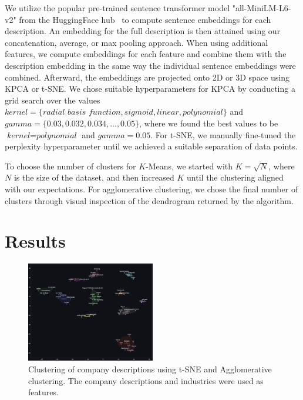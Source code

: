 \documentclass[conference]{IEEEtran}
\begin{document}
We utilize the popular pre-trained sentence transformer model "all-MiniLM-L6-v2" from the HuggingFace hub~\cite{sentence-transformer-model} to compute sentence embeddings for each description. An embedding for the full description is then attained using our concatenation, average, or max pooling approach. When using additional features, we compute embeddings for each feature and combine them with the description embedding in the same way the individual sentence embeddings were combined.
Afterward, the embeddings are projected onto 2D or 3D space using KPCA or t-SNE. We chose suitable hyperparameters for KPCA by conducting a grid search over the values $\textit{kernel} = \{\textit{radial basis function}, \textit{sigmoid}, \textit{linear}, \textit{polynomial} \}$ and $\textit{gamma} = \{0.03, 0.032, 0.034, \dots, 0.05\}$, where we found the best values to be $\textit{kernel} = \textit{polynomial}$ and $\textit{gamma} = 0.05$. For t-SNE, we manually fine-tuned the perplexity hyperparameter until we achieved a suitable separation of data points.

To choose the number of clusters for $K$-Means, we started with $K = \sqrt{N}$, where $N$ is the size of the dataset, and then increased $K$ until the clustering aligned with our expectations. For agglomerative clustering, we chose the final number of clusters through visual inspection of the dendrogram returned by the algorithm.

\section{Results}
\begin{figure}[H]
    \centering
    \includegraphics[width=0.5\textwidth]{figures/clustering_results.png}
    \caption{Clustering of company descriptions using t-SNE and Agglomerative clustering. The company descriptions and industries were used as features.}
    \label{fig:t-sne-agglomerative}
\end{figure}
\end{document}
